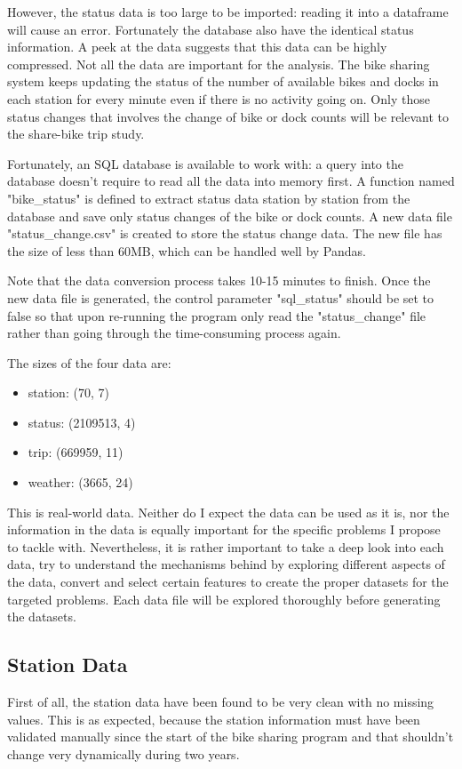 \documentclass[a4paper]{article}
\begin{document}
			However, the status data is too large to be imported: reading it into a dataframe will cause an error. Fortunately the database also have the identical status information. A peek at the data suggests that this data can be highly compressed. Not all the data are important for the analysis. The bike sharing system keeps updating the status of the number of available bikes and docks in each station for every minute even if there is no activity going on. Only those status changes that involves the change of bike or dock counts will be relevant to the share-bike trip study.
			
			Fortunately, an SQL database is available to work with: a query into the database doesn't require to read all the data into memory first. A function named "bike\_status" is defined to extract status data station by station from the database and save only status changes of the bike or dock counts. A new data file "status\_change.csv" is created to store the status change data. The new file has the size of less than 60MB, which can be handled well by Pandas.
			
			Note that the data conversion process takes 10-15 minutes to finish. Once the new data file is generated, the control parameter "sql\_status" should be set to false so that upon re-running the program only read the "status\_change" file rather than going through the time-consuming process again.
			
			The sizes of the four data are:
			\begin{itemize}
				\item station: (70, 7)
				\item status: (2109513, 4)
				\item trip: (669959, 11)
				\item weather: (3665, 24)
			\end{itemize}
			
			This is real-world data. Neither do I expect the data can be used as it is, nor the information in the data is equally important for the specific problems I propose to tackle with. Nevertheless, it is rather important to take a deep look into each data, try to understand the mechanisms behind by exploring different aspects of the data, convert and select certain features to create the proper datasets for the targeted problems. Each data file will be explored thoroughly before generating the datasets.
			
		\subsection{Station Data}
		First of all, the station data have been found to be very clean with no missing values. This is as expected, because the station information must have been validated manually since the start of the bike sharing program and that shouldn't change very dynamically during two years.
\end{document}

